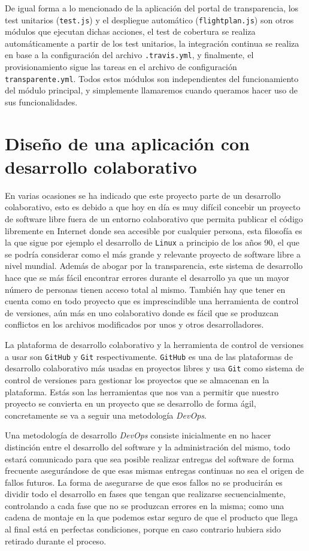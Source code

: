\bigskip
De igual forma a lo mencionado de la aplicación del portal de transparencia, los test unitarios ({\tt test.js}) y el despliegue automático ({\tt flightplan.js}) son otros módulos que ejecutan dichas acciones, el test de cobertura se realiza automáticamente a partir de los test unitarios, la integración continua se realiza en base a la configuración del archivo {\tt .travis.yml}, y finalmente, el provisionamiento sigue las tareas en el archivo de configuración {\tt transparente.yml}. Todos estos módulos son independientes del funcionamiento del módulo principal, y simplemente llamaremos cuando queramos hacer uso de sus funcionalidades.

\newpage
\section{Diseño de una aplicación con desarrollo colaborativo}

En varias ocasiones se ha indicado que este proyecto parte de un desarrollo colaborativo, esto es debido a que hoy en día es muy difícil concebir un proyecto de software libre fuera de un entorno colaborativo que permita publicar el código libremente en Internet donde sea accesible por cualquier persona, esta filosofía es la que sigue por ejemplo el desarrollo de {\tt Linux} a principio de los años 90, el que se podría considerar como el más grande y relevante proyecto de software libre a nivel mundial. Además de abogar por la transparencia, este sistema de desarrollo hace que se más fácil encontrar errores durante el desarrollo ya que un mayor número de personas tienen acceso total al mismo. También hay que tener en cuenta como en todo proyecto que es imprescindible una herramienta de control de versiones, aún más en uno colaborativo donde es fácil que se produzcan conflictos en los archivos modificados por unos y otros desarrolladores.

\bigskip
La plataforma de desarrollo colaborativo y la herramienta de control de versiones a usar son {\tt GitHub} y {\tt Git} respectivamente. {\tt GitHub} es una de las plataformas de desarrollo colaborativo más usadas en proyectos libres y usa {\tt Git} como sistema de control de versiones para gestionar los proyectos que se almacenan en la plataforma. Estás son las herramientas que nos van a permitir que nuestro proyecto se convierta en un proyecto que se desarrollo de forma ágil, concretamente se va a seguir una metodología \textit{DevOps}.

\bigskip
Una metodología de desarrollo \textit{DevOps} consiste inicialmente en no hacer distinción entre el desarrollo del software y la administración del mismo, todo estará comunicado para que sea posible realizar entregas del software de forma frecuente asegurándose de que esas mismas entregas continuas no sea el origen de fallos futuros. La forma de asegurarse de que esos fallos no se producirán es dividir todo el desarrollo en fases que tengan que realizarse secuencialmente, controlando a cada fase que no se produzcan errores en la misma; como una cadena de montaje en la que podemos estar seguro de que el producto que llega al final está en perfectas condiciones, porque en caso contrario hubiera sido retirado durante el proceso.

